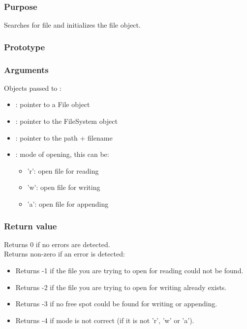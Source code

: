 \subsubsection*{Purpose}
Searches for file and initializes the file object.
\subsubsection*{Prototype}
\subsubsection*{Arguments}
Objects passed to :
\begin{itemize}
	\item{: pointer to a File object}
	\item{: pointer to the FileSystem object}
	\item{: pointer to the path + filename}
	\item
	{
		: mode of opening, this can be:
		\begin{itemize}
			\item{'r': open file for reading}
			\item{'w': open file for writing}
			\item{'a': open file for appending}
		\end{itemize}
	}
\end{itemize}
\subsubsection*{Return value}
Returns 0 if no errors are detected.\\
\newline
Returns non-zero if an error is detected:
\begin{itemize}
	\item{Returns -1 if the file you are trying to open for reading could not 
		be found.}
	\item{Returns -2 if the file you are trying to open for writing already
		exists.}
	\item{Returns -3 if no free spot could be found for writing or appending.}
	\item{Returns -4 if mode is not correct (if it is not 'r', 'w' or 'a').}
\end{itemize}
